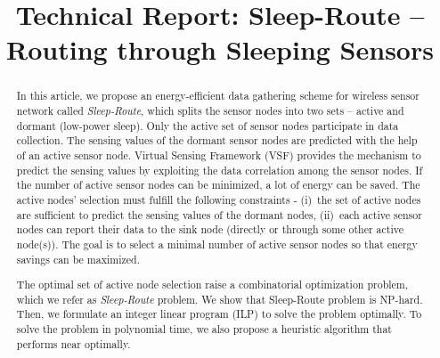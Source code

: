 \documentclass[conference]{IEEEtran}
\begin{document}
\title{Technical Report: Sleep-Route -- Routing through Sleeping Sensors}


\author{
}














\maketitle


\begin{abstract}
In this article, we propose an energy-efficient data gathering scheme for wireless sensor network called \emph{Sleep-Route}, which splits the sensor nodes into two sets -- active and dormant (low-power sleep). Only the active set of sensor nodes participate in data collection. The sensing values of the dormant sensor nodes are predicted with the help of an active sensor node. Virtual Sensing Framework (VSF) provides the mechanism to predict the sensing values by exploiting the data correlation among the sensor nodes. If the number of active sensor nodes can be minimized, a lot of energy can be saved. The active nodes' selection must fulfill the following constraints - (i)~the set of active nodes are sufficient to predict the sensing values of the dormant nodes, (ii)~each active sensor nodes can report their data to the sink node (directly or through some other active node(s)). The goal is to select a minimal number of active sensor nodes so that energy savings can be maximized.

The optimal set of active node selection raise a combinatorial optimization problem, which we refer as \emph{Sleep-Route} problem. We show that Sleep-Route problem is NP-hard. Then, we formulate an integer linear program (ILP) to solve the problem optimally. To solve the problem in polynomial time, we also propose a heuristic algorithm that performs near optimally.
\end{abstract}
\end{document}

